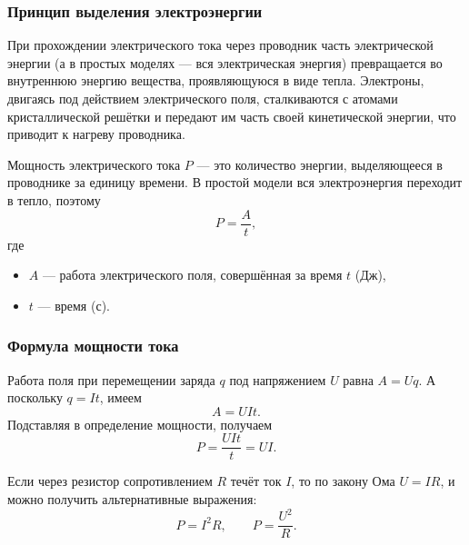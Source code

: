\documentclass[12pt, a4paper]{article}%
\begin{document}
\subsubsection*{Принцип выделения электроэнергии}

При прохождении электрического тока через проводник часть электрической энергии (а в простых моделях — вся электрическая энергия) превращается во внутреннюю энергию вещества, проявляющуюся в виде тепла.
Электроны, двигаясь под действием электрического поля, сталкиваются с атомами кристаллической решётки и передают им часть своей кинетической энергии, что приводит к нагреву проводника.

Мощность электрического тока $P$ — это количество энергии, выделяющееся в проводнике за единицу времени. В простой модели вся электроэнергия переходит в тепло, поэтому
\[
P = \frac{A}{t},
\]
где
\begin{itemize}
  \item $A$ — работа электрического поля, совершённая за время $t$ (Дж),
  \item $t$ — время (с).
\end{itemize}

\subsubsection*{Формула мощности тока}
Работа поля при перемещении заряда $q$ под напряжением $U$ равна $A = Uq$. А поскольку $q = It$, имеем
\[
A = UIt.
\]
Подставляя в определение мощности, получаем
\[
P = \frac{UIt}{t} = UI.
\]

Если через резистор сопротивлением $R$ течёт ток $I$, то по закону Ома $U = IR$, и можно получить альтернативные выражения:
\[
P = I^2R,
\qquad
P = \frac{U^2}{R}.
\]
\end{document}
